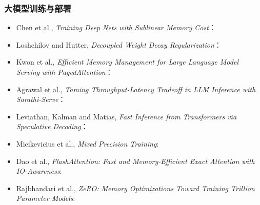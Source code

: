 \subsubsection*{大模型训练与部署}
\begin{itemize}
\item {}\label{source:activation-checkpoint}Chen et al., \emph{Training Deep Nets with Sublinear Memory Cost}：
\item {}\label{source:adamw}Loshchilov and Hutter, \emph{Decoupled Weight Decay Regularization}：
\item {}\label{source:paged-attention}Kwon et al., \emph{Efficient Memory Management for Large Language Model Serving with PagedAttention}：
\item {}\label{source:sarathi-serve}Agrawal et al., \emph{Taming Throughput-Latency Tradeoff in LLM Inference with Sarathi-Serve}：
\item {}\label{source:speculative-decoding}Leviathan, Kalman and Matias, \emph{Fast Inference from Transformers via Speculative Decoding}：
\item {}\label{source:mixed-precision}Micikevicius et al., \emph{Mixed Precision Training}:
\item {}\label{source:flash-attention}Dao et al., \emph{FlashAttention: Fast and Memory-Efficient Exact Attention with IO-Awareness}:
\item {}\label{source:zero}Rajbhandari et al., \emph{ZeRO: Memory Optimizations Toward Training Trillion Parameter Models}:

\end{itemize}
